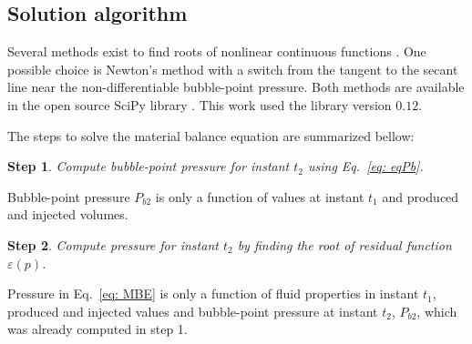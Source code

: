 \documentclass[final,authoryear,5p,twocolumn,10pt]{elsarticle}
\newtheorem{step}{Step}
\begin{document}

\subsection{Solution algorithm}
Several methods exist to find roots of nonlinear continuous functions \citep{hamming1987numerical}. One possible choice is Newton's method with a switch from the tangent to the secant line near the non-differentiable bubble-point pressure. Both methods are available in the open source SciPy library \citep{scipy}. This work used the library version $0.12$.




The steps to solve the material balance equation are summarized bellow:
\begin{step}
Compute bubble-point pressure for instant $t_2$ using Eq.~\eqref{eq: eqPb}.
\end{step}

Bubble-point pressure $P_{b2}$ is only a function of values at instant $t_1$ and produced and injected volumes.

\begin{step}
Compute pressure for instant $t_2$ by finding the root of residual function $\varepsilon \left(p\right)$.
\end{step}

Pressure in Eq.~\eqref{eq: MBE} is only a function of fluid properties in instant $t_1$, produced and injected values and bubble-point pressure at instant $t_2$, $P_{b2}$, which was already computed in step 1.
\end{document}
